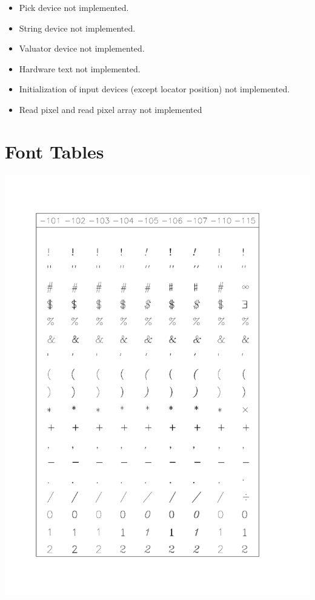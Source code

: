 \documentclass[11pt,nolof]{starlink}
\begin{document}

\begin{itemize}
\item Pick device not implemented.
\item String device not implemented.
\item Valuator device not implemented.
\item Hardware text not implemented.
\item Initialization of input devices (except locator position) not implemented.
\item Read pixel and read pixel array not implemented
\end{itemize}

\newpage\section{Font Tables}\label{fonts}

\includegraphics[height=0.95\textheight]{sun83_c1}
\end{document}
